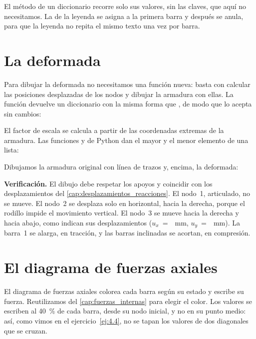 El método  de un diccionario recorre solo sus valores, sin las
claves, que aquí no necesitamos. La  de la leyenda se asigna a
la primera barra y después se anula, para que la leyenda no repita el mismo
texto una vez por barra.

\section{La deformada}\label{sec:deformada}

Para dibujar la deformada no necesitamos una función nueva: basta con
calcular las posiciones desplazadas de los nodos y dibujar la armadura con
ellas. La función devuelve un diccionario con la misma forma que ,
de modo que  lo acepta sin cambios:

El factor de escala se calcula a partir de las coordenadas extremas de la
armadura. Las funciones  y  de Python dan el mayor y el menor
elemento de una lista:

Dibujamos la armadura original con línea de trazos y, encima, la deformada:

\textbf{Verificación.} El dibujo debe respetar los apoyos y coincidir con
los desplazamientos del \cref{cap:desplazamientos_reacciones}. El nodo~1,
articulado, no se mueve. El nodo~2 se desplaza solo en horizontal, hacia la
derecha, porque el rodillo impide el movimiento vertical. El nodo~3 se mueve
hacia la derecha y hacia abajo, como indican sus desplazamientos
($u_x$~=~~\si{\milli\metre},
$u_y$~=~~\si{\milli\metre}). La
barra~1 se alarga, en tracción, y las barras inclinadas se acortan, en
compresión.

\section{El diagrama de fuerzas axiales}\label{sec:diagrama_fuerzas}

El diagrama de fuerzas axiales colorea cada barra según su estado y escribe
su fuerza. Reutilizamos  del \cref{cap:fuerzas_internas}
para elegir el color. Los valores se escriben al \SI{40}{\percent} de cada
barra, desde su nodo inicial, y no en su punto medio: así, como vimos en el
ejercicio~\ref{ej:4.4}, no se tapan los valores de dos diagonales que se
cruzan.

